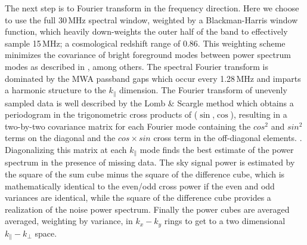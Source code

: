 \documentclass[preprint]{aastex}
\begin{document}
The next step is to Fourier transform in the frequency direction. Here we choose to use the full 30\,MHz spectral window, weighted by a Blackman-Harris window function, which heavily down-weights the outer half of the band to effectively sample 15\,MHz; a cosmological redshift range of 0.86. This weighting scheme minimizes the covariance of bright foreground modes between power spectrum modes as described in \cite{Thyagarajan:2013p10039,Parsons:2012p8896,Vedantham:2012p9026}, among others.  The spectral Fourier transform is dominated by the MWA passband gaps which occur every 1.28\,MHz and imparts a harmonic structure to the $k_\parallel$ dimension.  The Fourier transform of unevenly sampled data is well described by the Lomb \& Scargle method which obtains a periodogram in the trigonometric cross products of ($\sin$,$\cos$), resulting in a two-by-two covariance matrix for each Fourier mode containing the $cos^2$ and $sin^2$ terms on the diagonal and the $cos\times sin$ cross term in the off-diagonal elements. \cite{lomb1976,scargle1982}. Diagonalizing this matrix at each $k_\parallel$ mode finds the best estimate of the power spectrum in the presence of missing data.  The sky signal power is  estimated by the square of the sum cube minus the square of the difference cube, which  is mathematically identical to the even/odd cross power if the even and odd variances are identical, while the square of the difference cube provides a realization of the noise power spectrum. Finally the power cubes are averaged averaged, weighting by variance, in $k_x-k_y$ rings to get to a two dimensional $k_{\|}-k_{\bot}$ space.




\end{document}
